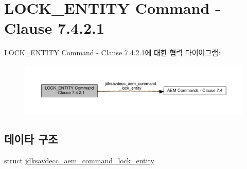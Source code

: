 \hypertarget{group__command__lock__entity}{}\section{L\+O\+C\+K\+\_\+\+E\+N\+T\+I\+TY Command -\/ Clause 7.4.2.1}
\label{group__command__lock__entity}
L\+O\+C\+K\+\_\+\+E\+N\+T\+I\+TY Command -\/ Clause 7.4.2.1에 대한 협력 다이어그램\+:
\nopagebreak
\begin{figure}[H]
\begin{center}
\leavevmode
\includegraphics[width=350pt]{group__command__lock__entity}
\end{center}
\end{figure}
\subsection*{데이타 구조}
\begin{DoxyCompactItemize}
\item 
struct \hyperlink{structjdksavdecc__aem__command__lock__entity}{jdksavdecc\+\_\+aem\+\_\+command\+\_\+lock\+\_\+entity}
\end{DoxyCompactItemize}
